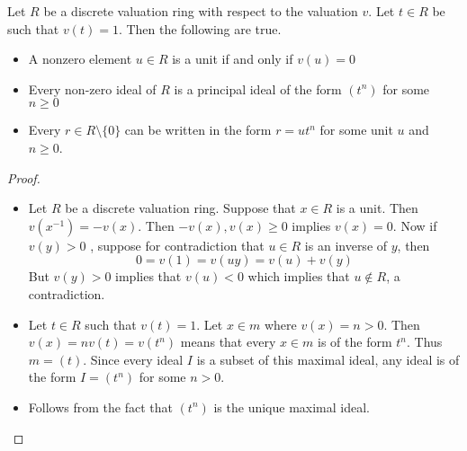 \documentclass[a4paper]{article}
\begin{document}
\begin{prp}{}{} Let $R$ be a discrete valuation ring with respect to the valuation $v$. Let $t\in R$ be such that $v(t)=1$. Then the following are true. 
\begin{itemize}
\item A nonzero element $u\in R$ is a unit if and only if $v(u)=0$
\item Every non-zero ideal of $R$ is a principal ideal of the form $(t^n)$ for some $n\geq 0$
\item Every $r\in R\setminus\{0\}$ can be written in the form $r=ut^n$ for some unit $u$ and $n\geq 0$. 
\end{itemize}\tcbline
\begin{proof}~\\
\begin{itemize}
\item Let $R$ be a discrete valuation ring. Suppose that $x\in R$ is a unit. Then $v(x^{-1})=-v(x)$. Then $-v(x),v(x)\geq 0$ implies $v(x)=0$. Now if $v(y)>0$ , suppose for contradiction that $u\in R$ is an inverse of $y$, then $$0=v(1)=v(uy)=v(u)+v(y)$$ But $v(y)>0$ implies that $v(u)<0$ which implies that $u\notin R$, a contradiction. 
\item Let $t\in R$ such that $v(t)=1$. Let $x\in m$ where $v(x)=n>0$. Then $v(x)=nv(t)=v(t^n)$ means that every $x\in m$ is of the form $t^n$. Thus $m=(t)$. Since every ideal $I$ is a subset of this maximal ideal, any ideal is of the form $I=(t^n)$ for some $n>0$. 
\item Follows from the fact that $(t^n)$ is the unique maximal ideal. 
\end{itemize}
\end{proof}
\end{prp}
\end{document}
